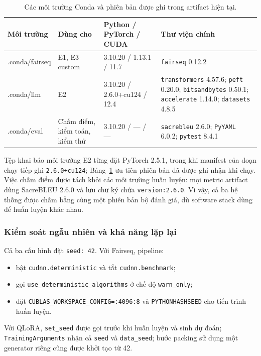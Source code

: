 \begin{table}[tbp]
  \centering
  \small
  \renewcommand{\arraystretch}{1.18}
  \caption{Các môi trường Conda và phiên bản được ghi trong artifact hiện tại.}
  \label{tab:compute-env}
  \begin{tabularx}{\textwidth}{@{}>{\ttfamily}p{2.3cm}p{2.3cm}p{3.15cm}X@{}}
    \toprule
    \normalfont\textbf{Môi trường} & \textbf{Dùng cho}
      & \textbf{Python / PyTorch / CUDA} & \textbf{Thư viện chính} \\
    \midrule
    .conda/\allowbreak fairseq
      & E1, E3-custom
      & 3.10.20 / 1.13.1 / 11.7
      & \texttt{fairseq} 0.12.2 \\
    .conda/llm
      & E2
      & 3.10.20 / 2.6.0+cu124 / 12.4
      & \texttt{transformers} 4.57.6; \texttt{peft} 0.20.0;
        \texttt{bitsandbytes} 0.50.1; \texttt{accelerate} 1.14.0;
        \texttt{datasets} 4.8.5 \\
    .conda/eval
      & Chấm điểm, kiểm toán, kiểm thử
      & 3.10.20 / --- / ---
      & \texttt{sacrebleu} 2.6.0; \texttt{PyYAML} 6.0.2;
        \texttt{pytest} 8.4.1 \\
    \bottomrule
  \end{tabularx}
\end{table}

Tệp khai báo môi trường E2 từng đặt PyTorch 2.5.1, trong khi manifest của đoạn
chạy tiếp ghi \texttt{2.6.0+cu124}; Bảng~\ref{tab:compute-env} ưu tiên phiên bản
đã được ghi nhận khi chạy. Việc chấm điểm được tách khỏi các môi trường huấn
luyện: mọi metric artifact dùng SacreBLEU 2.6.0 và lưu chữ ký chứa
\texttt{version:2.6.0}. Vì vậy, cả ba hệ thống được chấm bằng cùng một phiên bản
bộ đánh giá, dù software stack dùng để huấn luyện khác nhau.

\subsubsection{Kiểm soát ngẫu nhiên và khả năng lặp lại}

Cả ba cấu hình đặt \texttt{seed: 42}. Với Fairseq, pipeline:
\begin{itemize}
  \item bật \texttt{cudnn.deterministic} và tắt
  \texttt{cudnn.benchmark};
  \item gọi \texttt{use\_deterministic\_algorithms} ở chế độ
  \texttt{warn\_only};
  \item đặt \texttt{CUBLAS\_WORKSPACE\_CONFIG=:4096:8} và
  \texttt{PYTHONHASHSEED} cho tiến trình huấn luyện.
\end{itemize}
Với QLoRA, \texttt{set\_seed} được gọi trước khi huấn luyện và sinh dự đoán;
\texttt{TrainingArguments} nhận cả \texttt{seed} và \texttt{data\_seed}; bước
packing sử dụng một generator riêng cũng được khởi tạo từ 42.

